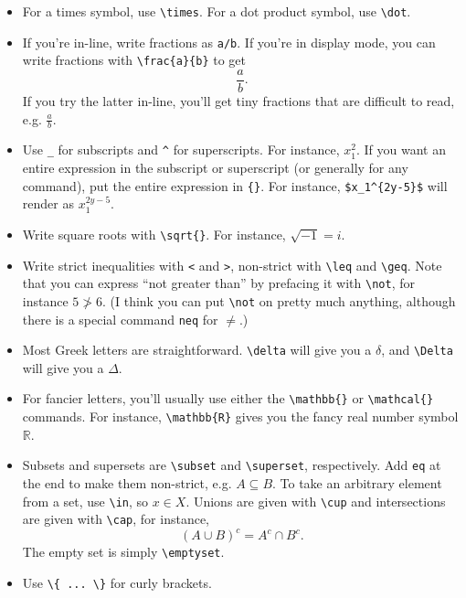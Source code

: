 \documentclass[12pt]{article}
\begin{document}
	\begin{itemize}
		\item For a times symbol, use \verb|\times|. For a dot product symbol, 
		use \verb|\dot|. 
		
		\item If you're in-line, write fractions as \verb|a/b|. If you're in display 
		mode, you can write fractions with \verb|\frac{a}{b}| to get
			\[ \frac{a}{b}. \]
		If you try the latter in-line, you'll get tiny fractions that are difficult to 
		read, e.g. $\frac{a}{b}$. 
		
		\item Use \verb|_| for subscripts and \verb|^| for superscripts. For 
		instance, $x_1^2$. If you want an entire expression in the subscript 
		or superscript (or generally for any command), put the entire expression
		in \verb|{}|. For instance, \verb|$x_1^{2y-5}$| will render as $x_1^{2y-5}$.
		
		\item Write square roots with \verb|\sqrt{}|. For instance, $\sqrt{-1}=i$. 
		
		\item Write strict inequalities with \verb|<| and \verb|>|, non-strict 
		with \verb|\leq| and \verb|\geq|. Note that you can express ``not 
		greater than'' by prefacing it with  \verb|\not|, for instance $5 \not > 6$. 
		(I think you can put \verb|\not| on pretty much anything, although there 
		is a special command \verb|neq| for $\neq$.)
		
		\item Most Greek letters are straightforward. \verb|\delta| will give you a
		$\delta$, and \verb|\Delta| will give you a $\Delta$. 
		
		\item For fancier letters, you'll usually use either the \verb|\mathbb{}| or 
		\verb|\mathcal{}| commands. For instance, \verb|\mathbb{R}| gives you
		the fancy real number symbol $\mathbb{R}$.
		
		\item Subsets and supersets are \verb|\subset| and \verb|\superset|, 
		respectively. Add \verb|eq| at the end to make them non-strict, e.g. 
		$A \subseteq B$. To take an arbitrary element from a set, use \verb|\in|, 
		so $x \in X$. Unions are given with \verb|\cup| and intersections are given 
		with \verb|\cap|, for instance,  
			\[	(A \cup B)^c=A^c \cap B^c . \]
		The empty set is simply \verb|\emptyset|. 
		
		\item Use \verb|\{ ... \}| for curly brackets. 
		

\end{itemize}
\end{document}
